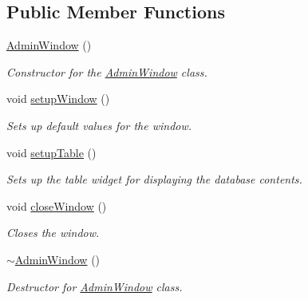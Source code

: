\subsection*{Public Member Functions}
\begin{DoxyCompactItemize}
\item 
\mbox{\label{classAdminWindow_a5c1134335698a59ea0a9e8effeeb8280}} 
\hyperlink{classAdminWindow_a5c1134335698a59ea0a9e8effeeb8280}{Admin\+Window} ()
\begin{DoxyCompactList}\small\item\em Constructor for the \hyperlink{classAdminWindow}{Admin\+Window} class. \end{DoxyCompactList}\item 
\mbox{\label{classAdminWindow_aae08d8e2c5922acaa6c14094a1438e81}} 
void \hyperlink{classAdminWindow_aae08d8e2c5922acaa6c14094a1438e81}{setup\+Window} ()
\begin{DoxyCompactList}\small\item\em Sets up default values for the window. \end{DoxyCompactList}\item 
\mbox{\label{classAdminWindow_a92878f8ea1bbefe1059338f19847cf15}} 
void \hyperlink{classAdminWindow_a92878f8ea1bbefe1059338f19847cf15}{setup\+Table} ()
\begin{DoxyCompactList}\small\item\em Sets up the table widget for displaying the database contents. \end{DoxyCompactList}\item 
\mbox{\label{classAdminWindow_a63e9b608e041ed1d3535483194022a4f}} 
void \hyperlink{classAdminWindow_a63e9b608e041ed1d3535483194022a4f}{close\+Window} ()
\begin{DoxyCompactList}\small\item\em Closes the window. \end{DoxyCompactList}\item 
\mbox{\label{classAdminWindow_ad31a734a759bfb65008b03e6bb9014d0}} 
\hyperlink{classAdminWindow_ad31a734a759bfb65008b03e6bb9014d0}{$\sim$\+Admin\+Window} ()
\begin{DoxyCompactList}\small\item\em Destructor for \hyperlink{classAdminWindow}{Admin\+Window} class. \end{DoxyCompactList}\end{DoxyCompactItemize}
